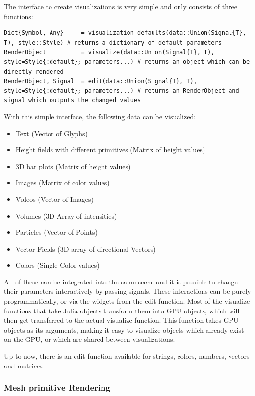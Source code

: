 The interface to create visualizations is very simple and only consists of three functions:
\begin{lstlisting}
Dict{Symbol, Any}     = visualization_defaults(data::Union(Signal{T}, T), style::Style) # returns a dictionary of default parameters
RenderObject          = visualize(data::Union(Signal{T}, T), style=Style{:default}; parameters...) # returns an object which can be directly rendered
RenderObject, Signal  = edit(data::Union(Signal{T}, T), style=Style{:default}; parameters...) # returns an RenderObject and signal which outputs the changed values
\end{lstlisting}

With this simple interface, the following data can be visualized:

\begin{itemize}
    \item Text (Vector of Glyphs)
    \item Height fields with different primitives (Matrix of height values)
    \item 3D bar plots (Matrix of height values)
    \item Images (Matrix of color values)
    \item Videos (Vector of Images)
    \item Volumes (3D Array of intensities)
    \item Particles (Vector of Points)
    \item Vector Fields (3D array of directional Vectors)
    \item Colors (Single Color values)
\end{itemize}

All of these can be integrated into the same scene and it is possible to change their parameters interactively by passing signals.
These interactions can be purely programmatically, or via the widgets from the edit function.
Most of the visualize functions that take Julia objects transform them into GPU objects, which will then get transferred to the actual visualize function. This function takes GPU objects as its arguments, making it easy to visualize objects which already exist on the GPU, or which are shared between visualizations.

Up to now, there is an edit function available for strings, colors, numbers, vectors and matrices.


\subsubsection{Mesh primitive Rendering}

